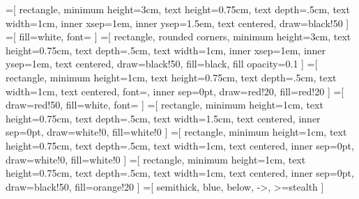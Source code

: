 \documentclass[11pt,a4paper,titlepage]{article}
\theoremstyle{definition}
\theoremstyle{plain}
\begin{document}

    \tableofcontents \clearpage

    \printglossaries \clearpage


    \setcounter{page}{1}

    =[%
    rectangle,
    minimum height=3cm,
    text height=0.75cm,
    text depth=.5cm,
    text width=1cm,
    inner xsep=1em,
    inner ysep=1.5em,
    text centered,
    draw=black!50
    ]
    =[%
    fill=white,
    font=\scriptsize
    ]
    =[%
    rectangle,
    rounded corners,
    minimum height=3cm,
    text height=0.75cm,
    text depth=.5cm,
    text width=1cm,
    inner xsep=1em,
    inner ysep=1em,
    text centered,
    draw=black!50,
    fill=black,
    fill opacity=0.1
    ]
    =[%
    rectangle,
    minimum height=1cm,
    text height=0.75cm,
    text depth=.5cm,
    text width=1cm,
    text centered,
    font=\scriptsize,
    inner sep=0pt,
    draw=red!20,
    fill=red!20
    ]
    =[%
    draw=red!50,
    fill=white,
    font=\tiny
    ]
    =[%
    rectangle,
    minimum height=1cm,
    text height=0.75cm,
    text depth=.5cm,
    text width=1.5cm,
    text centered,
    inner sep=0pt,
    draw=white!0,
    fill=white!0
    ]
    =[%
    rectangle,
    minimum height=1cm,
    text height=0.75cm,
    text depth=.5cm,
    text width=1cm,
    text centered,
    inner sep=0pt,
    draw=white!0,
    fill=white!0
    ]
    =[%
    rectangle,
    minimum height=1cm,
    text height=0.75cm,
    text depth=.5cm,
    text width=1cm,
    text centered,
    inner sep=0pt,
    draw=black!50,
    fill=orange!20
    ]
    =[%
    semithick,
    blue,
    below,
    ->,
    >=stealth
    ]

\end{document}
